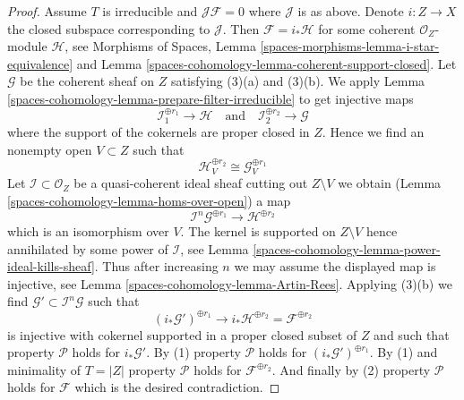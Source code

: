 \begin{proof}
\medskip\noindent
Assume $T$ is irreducible and $\mathcal{J}\mathcal{F} = 0$ where
$\mathcal{J}$ is as above. Denote $i : Z \to X$ the closed subspace
corresponding to $\mathcal{J}$. Then $\mathcal{F} = i_*\mathcal{H}$
for some coherent $\mathcal{O}_Z$-module $\mathcal{H}$, see
Morphisms of Spaces, Lemma \ref{spaces-morphisms-lemma-i-star-equivalence}
and Lemma \ref{spaces-cohomology-lemma-coherent-support-closed}.
Let $\mathcal{G}$ be the coherent sheaf on $Z$ satisfying
(3)(a) and (3)(b). We apply Lemma \ref{spaces-cohomology-lemma-prepare-filter-irreducible}
to get injective maps
$$
\mathcal{I}_1^{\oplus r_1} \to \mathcal{H}
\quad\text{and}\quad
\mathcal{I}_2^{\oplus r_2} \to \mathcal{G}
$$
where the support of the cokernels are proper closed in $Z$. Hence we find
an nonempty open $V \subset Z$ such that
$$
\mathcal{H}^{\oplus r_2}_V \cong \mathcal{G}^{\oplus r_1}_V
$$
Let $\mathcal{I} \subset \mathcal{O}_Z$ be a quasi-coherent ideal sheaf
cutting out $Z \setminus V$ we obtain
(Lemma \ref{spaces-cohomology-lemma-homs-over-open})
a map
$$
\mathcal{I}^n\mathcal{G}^{\oplus r_1} \longrightarrow \mathcal{H}^{\oplus r_2}
$$
which is an isomorphism over $V$. The kernel is supported on $Z \setminus V$
hence annihilated by some power of $\mathcal{I}$, see
Lemma \ref{spaces-cohomology-lemma-power-ideal-kills-sheaf}. Thus after increasing
$n$ we may assume the displayed map is injective, see
Lemma \ref{spaces-cohomology-lemma-Artin-Rees}. Applying (3)(b) we find
$\mathcal{G}' \subset \mathcal{I}^n\mathcal{G}$ such that
$$
(i_*\mathcal{G}')^{\oplus r_1} \longrightarrow
i_*\mathcal{H}^{\oplus r_2} = \mathcal{F}^{\oplus r_2}
$$
is injective with cokernel supported in a proper closed subset of $Z$
and such that property $\mathcal{P}$ holds for $i_*\mathcal{G}'$.
By (1) property $\mathcal{P}$ holds for $(i_*\mathcal{G}')^{\oplus r_1}$.
By (1) and minimality of $T = |Z|$ property $\mathcal{P}$ holds for
$\mathcal{F}^{\oplus r_2}$. And finally by (2) property $\mathcal{P}$
holds for $\mathcal{F}$ which is the desired contradiction.
\end{proof}

